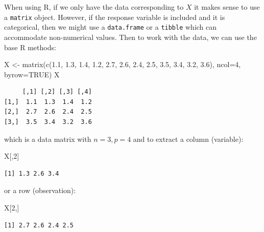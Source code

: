 \documentclass[
  letterpaper,
]{book}
\newenvironment{Shaded}{\begin{snugshade}}{\end{snugshade}}
\newcommand{\AttributeTok}[1]{\textcolor[rgb]{0.40,0.45,0.13}{#1}}
\newcommand{\ConstantTok}[1]{\textcolor[rgb]{0.56,0.35,0.01}{#1}}
\newcommand{\DecValTok}[1]{\textcolor[rgb]{0.68,0.00,0.00}{#1}}
\newcommand{\FloatTok}[1]{\textcolor[rgb]{0.68,0.00,0.00}{#1}}
\newcommand{\FunctionTok}[1]{\textcolor[rgb]{0.28,0.35,0.67}{#1}}
\newcommand{\NormalTok}[1]{\textcolor[rgb]{0.00,0.23,0.31}{#1}}
\newcommand{\OtherTok}[1]{\textcolor[rgb]{0.00,0.23,0.31}{#1}}
\begin{document}
When using R, if we only have the data corresponding to \(X\) it makes
sense to use a \texttt{matrix} object. However, if the response variable
is included and it is categorical, then we might use a
\texttt{data.frame} or a \texttt{tibble} which can accommodate
non-numerical values. Then to work with the data, we can use the base R
methods:

\begin{Shaded}
\begin{Highlighting}[]
\NormalTok{X }\OtherTok{\textless{}{-}} \FunctionTok{matrix}\NormalTok{(}\FunctionTok{c}\NormalTok{(}\FloatTok{1.1}\NormalTok{, }\FloatTok{1.3}\NormalTok{, }\FloatTok{1.4}\NormalTok{, }\FloatTok{1.2}\NormalTok{, }\FloatTok{2.7}\NormalTok{, }\FloatTok{2.6}\NormalTok{, }\FloatTok{2.4}\NormalTok{, }\FloatTok{2.5}\NormalTok{, }\FloatTok{3.5}\NormalTok{, }\FloatTok{3.4}\NormalTok{, }\FloatTok{3.2}\NormalTok{, }\FloatTok{3.6}\NormalTok{), }\AttributeTok{ncol=}\DecValTok{4}\NormalTok{, }\AttributeTok{byrow=}\ConstantTok{TRUE}\NormalTok{)}
\NormalTok{X}
\end{Highlighting}
\end{Shaded}

\begin{verbatim}
     [,1] [,2] [,3] [,4]
[1,]  1.1  1.3  1.4  1.2
[2,]  2.7  2.6  2.4  2.5
[3,]  3.5  3.4  3.2  3.6
\end{verbatim}

which is a data matrix with \(n=3, p=4\) and to extract a column
(variable):

\begin{Shaded}
\begin{Highlighting}[]
\NormalTok{X[,}\DecValTok{2}\NormalTok{]}
\end{Highlighting}
\end{Shaded}

\begin{verbatim}
[1] 1.3 2.6 3.4
\end{verbatim}

or a row (observation):

\begin{Shaded}
\begin{Highlighting}[]
\NormalTok{X[}\DecValTok{2}\NormalTok{,]}
\end{Highlighting}
\end{Shaded}

\begin{verbatim}
[1] 2.7 2.6 2.4 2.5
\end{verbatim}
\end{document}
